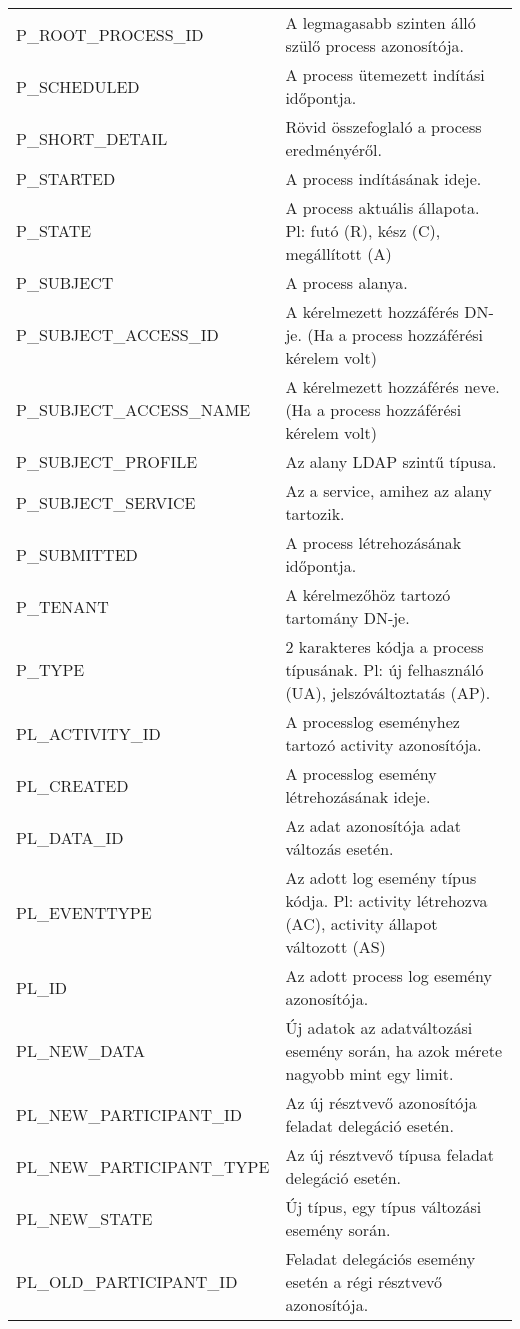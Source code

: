 \begin{table}[htbp]
\begin{tabular}{p{.20\linewidth}p{.80\linewidth}}
		P\_ROOT\_PROCESS\_ID & A legmagasabb szinten álló szülő process azonosítója. \\
		P\_SCHEDULED & A process ütemezett indítási időpontja. \\
		P\_SHORT\_DETAIL & Rövid összefoglaló a process eredményéről. \\
		P\_STARTED & A process indításának ideje. \\
		P\_STATE & A process aktuális állapota. Pl: futó (R), kész (C), megállított (A) \\
		P\_SUBJECT & A process alanya. \\
		P\_SUBJECT\_ACCESS\_ID & A kérelmezett hozzáférés DN-je. (Ha a process hozzáférési kérelem volt) \\
		P\_SUBJECT\_ACCESS\_NAME & A kérelmezett hozzáférés neve. (Ha a process hozzáférési kérelem volt) \\
		P\_SUBJECT\_PROFILE & Az alany LDAP szintű típusa. \\
		P\_SUBJECT\_SERVICE & Az a service, amihez az alany tartozik. \\
		P\_SUBMITTED & A process létrehozásának időpontja. \\
		P\_TENANT & A kérelmezőhöz tartozó tartomány DN-je. \\
		P\_TYPE & 2 karakteres kódja a process típusának. Pl: új felhasználó (UA), jelszóváltoztatás (AP). \\
		PL\_ACTIVITY\_ID & A processlog eseményhez tartozó activity azonosítója. \\
		PL\_CREATED & A processlog esemény létrehozásának ideje. \\
		PL\_DATA\_ID & Az adat azonosítója adat változás esetén. \\
		PL\_EVENTTYPE & Az adott log esemény típus kódja. Pl: activity létrehozva (AC), activity állapot változott (AS) \\
		PL\_ID & Az adott process log esemény azonosítója. \\
		PL\_NEW\_DATA & Új adatok az adatváltozási esemény során, ha azok mérete nagyobb mint egy limit. \\
		PL\_NEW\_PARTICIPANT\_ID & Az új résztvevő azonosítója feladat delegáció esetén. \\
		PL\_NEW\_PARTICIPANT\_TYPE & Az új résztvevő típusa feladat delegáció esetén. \\
		PL\_NEW\_STATE & Új típus, egy típus változási esemény során. \\
		PL\_OLD\_PARTICIPANT\_ID & Feladat delegációs esemény esetén a régi résztvevő azonosítója. \\

\end{tabular}
\end{table}

